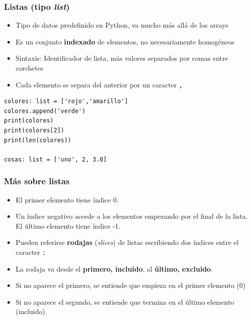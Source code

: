 \begin{frame}[fragile]
\frametitle{Listas (tipo \emph{list})}

\begin{itemize}
\item Tipo de datos predefinido en Python, va mucho más allá de los
  arrays
\item Es un conjunto {\bf indexado} de elementos, no necesariamente homogéneos
\item Sintaxis: Identificador de lista, más valores separados por comas entre corchetes
\item Cada elemento se separa del anterior por un caracter \verb|,|
\end{itemize}
  \begin{footnotesize}
\begin{verbatim}
colores: list = ['rojo','amarillo']
colores.append('verde')
print(colores)
print(colores[2])
print(len(colores))

cosas: list = ['uno', 2, 3.0]

\end{verbatim}
  \end{footnotesize}

\end{frame}



\begin{frame}[fragile]
\frametitle{Más sobre listas}

\begin{itemize}
\item El primer elemento tiene índice 0.
\item Un índice negativo accede a los elementos empezando por el final
  de la lista. El último elemento tiene índice -1.
\item Pueden referirse {\bf rodajas} (\emph{slices}) de listas
  escribiendo dos índices entre el caracter \verb|:|
\item La rodaja va desde el {\bf primero, incluido}, al {\bf último,
    excluido}.
\item Si no aparece el primero, se entiende que empieza en el primer
  elemento (0)
\item Si no aparece el segundo, se entiende que termina en el último
  elemento (incluido). 
\end{itemize}
\end{frame}


